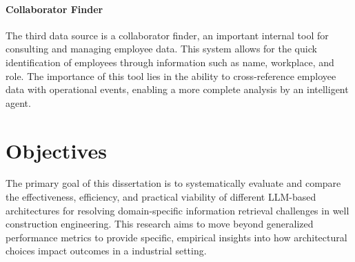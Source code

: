         \paragraph{Collaborator Finder} The third data source is a collaborator finder, an important internal tool for consulting and managing employee data. This system allows for the quick identification of employees through information such as name, workplace, and role. The importance of this tool lies in the ability to cross-reference employee data with operational events, enabling a more complete analysis by an intelligent agent.

\section{Objectives}

    
    
            

    The primary goal of this dissertation is to systematically evaluate and compare the effectiveness, efficiency, and practical viability of different LLM-based architectures for resolving domain-specific information retrieval challenges in well construction engineering. 
    This research aims to move beyond generalized performance metrics to provide specific, empirical insights into how architectural choices impact outcomes in a industrial setting.

